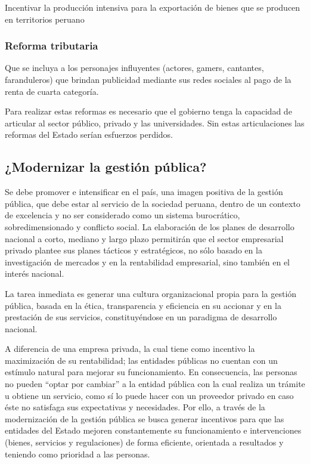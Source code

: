 \documentclass[
  a4paper,
]{article}
\begin{document}
Incentivar la producción intensiva para la exportación de bienes que se
producen en territorios peruano

\hypertarget{reforma-tributaria}{%
\subsubsection{Reforma tributaria}\label{reforma-tributaria}}

Que se incluya a los personajes influyentes (actores, gamers, cantantes,
faranduleros) que brindan publicidad mediante sus redes sociales al pago
de la renta de cuarta categoría.

Para realizar estas reformas es necesario que el gobierno tenga la
capacidad de articular al sector público, privado y las universidades.
Sin estas articulaciones las reformas del Estado serían esfuerzos
perdidos.

\hypertarget{modernizar-la-gestiuxf3n-puxfablica}{%
\subsection{¿Modernizar la gestión
pública?}\label{modernizar-la-gestiuxf3n-puxfablica}}

Se debe promover e intensificar en el país, una imagen positiva de la
gestión pública, que debe estar al servicio de la sociedad peruana,
dentro de un contexto de excelencia y no ser considerado como un sistema
burocrático, sobredimensionado y conflicto social. La elaboración de los
planes de desarrollo nacional a corto, mediano y largo plazo permitirán
que el sector empresarial privado plantee sus planes tácticos y
estratégicos, no sólo basado en la investigación de mercados y en la
rentabilidad empresarial, sino también en el interés nacional.

La tarea inmediata es generar una cultura organizacional propia para la
gestión pública, basada en la ética, transparencia y eficiencia en su
accionar y en la prestación de sus servicios, constituyéndose en un
paradigma de desarrollo nacional.

A diferencia de una empresa privada, la cual tiene como incentivo la
maximización de su rentabilidad; las entidades públicas no cuentan con
un estímulo natural para mejorar su funcionamiento. En consecuencia, las
personas no pueden ``optar por cambiar'' a la entidad pública con la
cual realiza un trámite u obtiene un servicio, como sí lo puede hacer
con un proveedor privado en caso éste no satisfaga sus expectativas y
necesidades. Por ello, a través de la modernización de la gestión
pública se busca generar incentivos para que las entidades del Estado
mejoren constantemente su funcionamiento e intervenciones (bienes,
servicios y regulaciones) de forma eficiente, orientada a resultados y
teniendo como prioridad a las personas.
\end{document}
